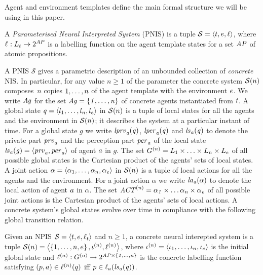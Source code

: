 Agent and environment templates define the main formal structure we will be
using in this paper.

\begin{definition}
  A {\em Parameterised Neural Interpreted System} (PNIS) is a tuple $\mathcal S
  = \left \langle {t}, {e}, \ell \right \rangle$, where $\ell_{} : L_{t} \rightarrow 2^{AP}$ is
  a labelling function on the agent  template states for a set $\it{AP}$ of
  atomic propositions.
\end{definition}

A PNIS $\mathcal S$ gives a  parametric description of an unbounded collection
of {\em concrete} NIS. In particular, for any value $n \geq 1$ of the parameter
the concrete system $\mathcal{S}(n)$ composes~$n$ copies ${1}, \ldots, {n}$ of the
agent template with the environment ${e}$. We write $\it{Ag}$ for the set
$\it{Ag} = \left \{ {1}, \ldots, {n} \right \}$ of concrete agents instantiated from ${t}$.   A global state $q = \left \langle l_{1}, \ldots, l_{n}, l_{e} \right \rangle$ in
$\mathcal{S}(n)$ is a tuple of local states for all the agents and the environment in
$\mathcal{S}(n)$; it describes the system at a particular instant of time.  For a global
state $g$ we write $\it{lprv}_{a}(q)$, $\it{lper}_{a}(q)$ and $\it{ls}_{a}(q)$ to denote the
private part $\it{prv}_{a}$ and the perception part $\it{per}_{a}$ of the local state
$\it{ls}_{a}(g) = \left \langle \it{prv}_{a}, \it{per}_{a} \right \rangle$ of agent ${a}$ in $g$.  The set
$G^{(n)} = L_{1} \times \ldots \times L_{n} \times L_e$ of all
possible global states is the Cartesian product of the agents’ sets of local
states.  A joint action $\alpha = \left \langle \alpha_1, \ldots, \alpha_n, \alpha_e \right \rangle$
in $\mathcal{S}(n)$ is a tuple of local actions for all the agents and the environment.
For a joint action $\alpha$ we write $\it{la}_{a}({\alpha})$ to denote the local action
of agent ${a}$ in $\alpha$.  The set $\it{ACT}^{(n)} = \it{\alpha}_{1} \times \ldots \it{\alpha}_{n}
\times \it{\alpha}_{e}$ of all possible joint actions is the Cartesian product of the
agents’ sets of local actions.  A concrete system's global states evolve over
time in compliance with the following global transition relation.


\begin{definition}
  \label{def:concreteystem}
Given an NPIS $\mathcal S = \left \langle {t}, {e}, \ell_t \right \rangle$ and $n \geq 1$, a
concrete neural interepted system is a tuple $\mathcal{S}(n) = \left \langle  \left \{ {1},
\ldots, {n}, {e} \right \}, \iota^{({n})}, \ell^{(n)} \right \rangle$, where $\iota^{({n})} =
\left \langle \iota_{1}, \ldots, \iota_{n}, \iota_{e} \right \rangle$ is the initial global state and
$\ell^{(n)} :  G^{(n)} \rightarrow 2^{\it{AP} \times \left \{ 1, \ldots,
n \right \}}$ is the concrete labelling function satisfying $(p, a) \in \ell^{(n)}
(q)$ iff $p \in \ell_{a}(\it{ls}_{a}(q))$.
\end{definition}

